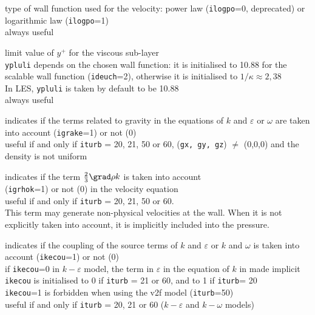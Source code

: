 {type of wall function used for the velocity: power law
({\tt ilogpo}=0, deprecated) or logarithmic law ({\tt ilogpo}=1)\\
always useful}

{limit value of $y^+$ for the viscous sub-layer\\
{\tt ypluli} depends on the chosen wall function: it is
initialised to 10.88 for the scalable wall function ({\tt ideuch}=2),
otherwise it is initialised to $1/\kappa\approx 2,38$\\
In LES, {\tt ypluli} is taken by default to be 10.88\\
always useful}


{indicates if the terms related to gravity in the
equations of $k$ and $\varepsilon$ or $\omega$ are taken into account
({\tt igrake}=1) or not (0)\\
useful if and only if {\tt iturb} = 20, 21, 50 or 60, ({\tt gx, gy, gz})
$\ne$ (0,0,0) and the density is not uniform}

{indicates if the term $\frac{2}{3}\grad \rho k$
is taken into account\\ ({\tt igrhok}=1) or not (0) in the velocity
equation\\
useful if and only if {\tt iturb} = 20, 21, 50 or 60.\\
This term may generate
non-physical velocities at the wall. When it is not explicitly taken into
account, it is implicitly included into the pressure.}

{indicates if the coupling of the source terms of
$k$ and $\varepsilon$ or $k$ and $\omega$ is taken into account
({\tt ikecou}=1) or not (0)\\
if {\tt ikecou}=0 in $k-\varepsilon$ model, the term in $\varepsilon$ in the
equation of $k$ in made implicit\\
{\tt ikecou} is initialised to 0 if {\tt iturb} = 21 or 60,
and to 1 if {\tt iturb}= 20\\
{\tt ikecou}=1 is forbidden when using the v2f model
({\tt iturb}=50)\\
useful if and only if {\tt iturb} = 20, 21 or 60 ($k-\varepsilon$ and
$k-\omega$ models)}

